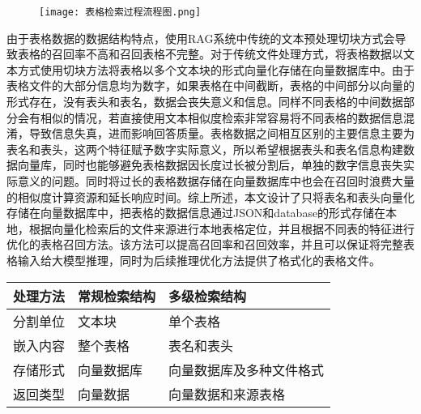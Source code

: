 \begin{figure}[h]
    \centering
    \texttt{[image: 表格检索过程流程图.png]}
    \label{fig:4-4}
\end{figure}
由于表格数据的数据结构特点，使用RAG系统中传统的文本预处理切块方式会导致表格的召回率不高和召回表格不完整。对于传统文件处理方式，将表格数据以文本方式使用切块方法将表格以多个文本块的形式向量化存储在向量数据库中。由于表格文件的大部分信息均为数字，如果表格在中间截断，表格的中间部分以向量的形式存在，没有表头和表名，数据会丧失意义和信息。同样不同表格的中间数据部分会有相似的情况，若直接使用文本相似度检索非常容易将不同表格的数据信息混淆，导致信息失真，进而影响回答质量。表格数据之间相互区别的主要信息主要为表名和表头，这两个特征赋予数字实际意义，所以希望根据表头和表名信息构建数据向量库，同时也能够避免表格数据因长度过长被分割后，单独的数字信息丧失实际意义的问题。同时将过长的表格数据存储在向量数据库中也会在召回时浪费大量的相似度计算资源和延长响应时间。综上所述，本文设计了只将表名和表头向量化存储在向量数据库中，把表格的数据信息通过JSON和database的形式存储在本地，根据向量化检索后的文件来源进行本地表格定位，并且根据不同表的特征进行优化的表格召回方法。该方法可以提高召回率和召回效率，并且可以保证将完整表格输入给大模型推理，同时为后续推理优化方法提供了格式化的表格文件。
\begin{table}[h]
    \centering
    \label{tab:方法对比}
    \begin{tabularx}{\linewidth}{@{}XXX@{}}
        \toprule[1.5pt]
        {处理方法} & {常规检索结构} & {多级检索结构} \\
        \midrule[1pt]
        分割单位 & 文本块 & 单个表格 \\
        嵌入内容 & 整个表格 & 表名和表头 \\
        存储形式 & 向量数据库 & 向量数据库及多种文件格式 \\
        返回类型 & 向量数据 & 向量数据和来源表格 \\
        \bottomrule[1.5pt]
    \end{tabularx}
\end{table}

